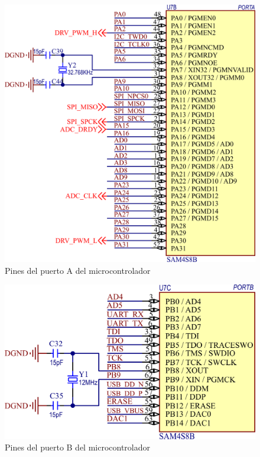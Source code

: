\documentclass[../et.tex]{subfiles}
\begin{document}
\begin{figure}[!htbp]
  \centering
  \includegraphics[scale=1.5]{../images/arm-gpio-port-a.png}
  \caption{Pines del puerto A del microcontrolador}
  \label{fig:arm-gpio-port-a}
\end{figure}

\begin{figure}[!htbp]
  \centering
  \includegraphics[scale=1.5]{../images/arm-gpio-port-b.png}
  \caption{Pines del puerto B del microcontrolador}
  \label{fig:arm-gpio-port-b}
\end{figure}
\end{document}
